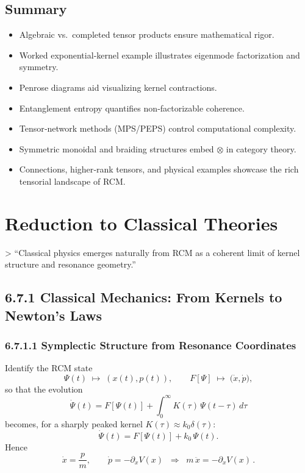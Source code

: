 \subsection*{Summary}

\begin{itemize}
  \item Algebraic vs.\ completed tensor products ensure mathematical rigor.
  \item Worked exponential‐kernel example illustrates eigenmode factorization and symmetry.
  \item Penrose diagrams aid visualizing kernel contractions.
  \item Entanglement entropy quantifies non‐factorizable coherence.
  \item Tensor‐network methods (MPS/PEPS) control computational complexity.
  \item Symmetric monoidal and braiding structures embed \(\otimes\) in category theory.
  \item Connections, higher‐rank tensors, and physical examples showcase the rich tensorial landscape of RCM.
\end{itemize}

\section{Reduction to Classical Theories}

> “Classical physics emerges naturally from RCM as a coherent limit of kernel structure and resonance geometry.”

\subsection{6.7.1 Classical Mechanics: From Kernels to Newton’s Laws}

\subsubsection*{6.7.1.1 Symplectic Structure from Resonance Coordinates}

Identify the RCM state
\[
\Psi(t)\;\longmapsto\;(x(t),p(t)),
\qquad
F[\Psi]\;\longmapsto\;\bigl(\dot x,\dot p\bigr),
\]
so that the evolution
\[
\dot\Psi(t)
=F[\Psi(t)]
+\int_{0}^{\infty}K(\tau)\,\Psi(t-\tau)\,d\tau
\]
becomes, for a sharply peaked kernel \(K(\tau)\approx k_0\delta(\tau)\):
\[
\dot\Psi(t)
=F[\Psi(t)]+k_0\,\Psi(t).
\]
Hence
\[
\dot x=\frac{p}{m},\qquad
\dot p=-\partial_xV(x)
\;\;\Longrightarrow\;\;
m\,\ddot x=-\partial_xV(x)\,.
\]

